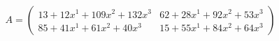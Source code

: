 \documentclass[preview]{standalone}
\begin{document}
\begin{align*}
A = \begin{pmatrix}13 + 12x^{1} + 109x^{2} + 132x^{3} & 62 + 28x^{1} + 92x^{2} + 53x^{3} \\ 85 + 41x^{1} + 61x^{2} + 40x^{3} & 15 + 55x^{1} + 84x^{2} + 64x^{3}\end{pmatrix}
\end{align*}
\end{document}
